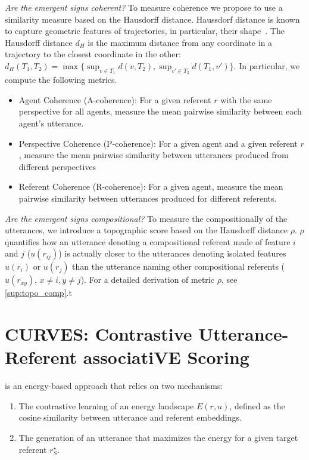 \textit{Are the emergent signs coherent? } To measure coherence we propose to use a similarity measure based on the Hausdorff distance. Haussdorf distance is known to capture geometric features of trajectories, in particular, their shape~\citep{Besse2015review}. The Hausdorff distance $d_H$ is the maximum distance from any coordinate in a trajectory to the closest coordinate in the other:
$d_H(T_1,T_2) = \max\{\sup_{v \in T_1} d(v,T_2), \sup_{v' \in T_2}d(T_1,v') \}$.
In particular, we compute the following metrics.
\begin{itemize}[noitemsep,topsep=0pt]
    \item Agent Coherence (A-coherence): For a given referent $r$ with the same perspective for all agents, measure the mean pairwise similarity between each agent's utterance.
    \item Perspective Coherence (P-coherence): For a given agent and a given referent $r$, measure the mean pairwise similarity between utterances produced from different perspectives 
    \item Referent Coherence (R-coherence): For a given agent, measure the mean pairwise similarity between utterances produced for different referents.
\end{itemize}

\textit{Are the emergent signs compositional? } To measure the compositionally of the utterances, we introduce a topographic score based on the Hausdorff distance $\rho$. $\rho$ quantifies how an utterance denoting a compositional referent made of feature $i$ and $j$ ($u(r_{ij})$) is actually closer to the utterances denoting isolated features $u(r_i)$ or $u(r_j)$ than the utterance naming other compositional referents ($u(r_{xy})$, $x\neq i, y\neq j$). For a detailed derivation of metric $\rho$, see \ap\ref{sup:topo_comp}.t

\section{CURVES: Contrastive Utterance-Referent associatiVE Scoring}


\curves is an energy-based approach that relies on two mechanisms:
\begin{enumerate}[noitemsep,topsep=0pt]
\item  The contrastive learning of an energy landscape $E(r,u)$, defined as the cosine similarity between utterance and referent embeddings.
\item The generation of an utterance that maximizes the energy for a given target referent $r^\star_S$.
\end{enumerate}

